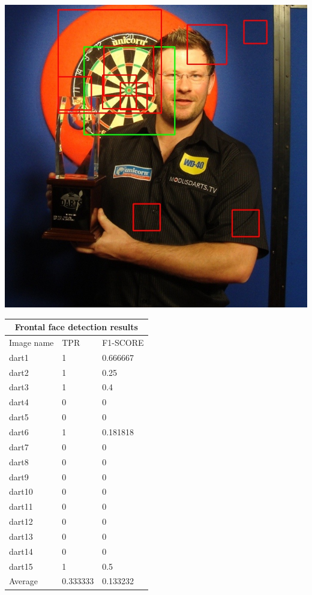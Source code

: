 \documentclass{article}
\begin{document}
\begin{multicols}{2}
\begin{multicols}{3}
    \includegraphics[width=\linewidth]{dart4-dart.jpg}\par
\end{multicols}
\label{tab:vjdartsimages}


\begin{tabular}{ |p{2cm}||p{2cm}|p{2cm}| }
 \hline
 \multicolumn{3}{|c|}{Frontal face detection results} \\
 \hline
 Image name & TPR & F1-SCORE \\
 \hline
 dart1  & 1  & 0.666667   \\
 dart2  & 1  & 0.25       \\
 dart3  & 1  & 0.4        \\
 dart4  & 0  & 0          \\
 dart5  & 0  & 0          \\
 dart6  & 1  & 0.181818   \\
 dart7  & 0  & 0          \\
 dart8  & 0  & 0          \\
 dart9  & 0  & 0          \\
 dart10 & 0  & 0          \\
 dart11 & 0  & 0          \\
 dart12 & 0  & 0          \\
 dart13 & 0  & 0          \\
 dart14 & 0  & 0          \\
 dart15 & 1  & 0.5        \\
 \hline
 Average& 0.333333  & 0.133232    \\ 
 \hline
\end{tabular}
\label{tab:vjdartstable}



\end{multicols}
\end{document}
